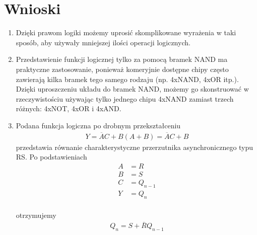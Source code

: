 \documentclass[12pt,a4paper,openright]{mwrep}
\begin{document}


\newpage
\section{Wnioski}
\begin{enumerate}
    \item Dzięki prawom logiki możemy uprosić skomplikowane wyrażenia
    w taki sposób, aby używały mniejszej ilości operacji logicznych.
    \item Przedstawienie funkcji logicznej tylko za pomocą bramek NAND
    ma praktyczne zastosowanie, ponieważ komeryjnie dostępne chipy często
    zawierają kilka bramek tego samego rodzaju (np. 4xNAND, 4xOR itp.).
    Dzięki uproszczeniu układu do bramek NAND, możemy go skonstruować
    w rzeczywistościu używając tylko jednego chipu 4xNAND zamiast
    trzech różnych: 4xNOT, 4xOR i 4xAND.
    \item Podana funkcja logiczna po drobnym przekształceniu
    \begin{align*}
        Y = \overline{A}C + B(A + B) = \overline{A}C + B
    \end{align*}
    przedstawia równanie charakterystyczne przerzutnika 
    asynchronicznego typu RS. 
    Po podstawieniach
    \begin{align*}
        A &= R\\
        B &= S\\
        C &= Q_{n-1}\\
        Y &= Q_{n}\\
    \end{align*}
        
    otrzymujemy
    \begin{align*}
        Q_{n} = S + \overline{R}Q_{n-1}
    \end{align*}
\end{enumerate}
\end{document}
